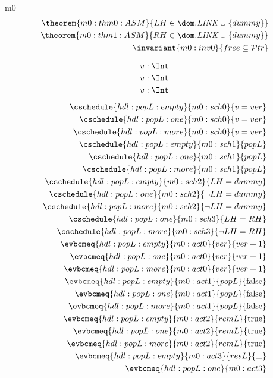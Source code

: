 \documentclass[12pt]{amsart}
\newcommand{\Addr}{\mathcal{P}tr}
\newcommand{\link}{\textit{LINK}}
\begin{document}
\begin{machine}{m0}
\begin{align*}
  \theorem{m0:thm0:ASM}{ LH \in \dom.\link \bunion \{ dummy \} } \\
  \theorem{m0:thm1:ASM}{ RH \in \dom.\link \bunion \{ dummy \} } \\
  \invariant{m0:inv0}{ free \subseteq \Addr }
\end{align*}

\[ \indices{hdl:popL:empty}{ v : \Int } \]
\[ \indices{hdl:popL:one}{ v : \Int } \]
\[ \indices{hdl:popL:more}{ v : \Int } \]

\begin{align*}
  \cschedule{hdl:popL:empty}{m0:sch0}{v = ver} \\
  \cschedule{hdl:popL:one}{m0:sch0}{v = ver} \\
  \cschedule{hdl:popL:more}{m0:sch0}{v = ver} \\
  \cschedule{hdl:popL:empty}{m0:sch1}{popL} \\
  \cschedule{hdl:popL:one}{m0:sch1}{popL} \\
  \cschedule{hdl:popL:more}{m0:sch1}{popL} \\
  \cschedule{hdl:popL:empty}{m0:sch2}{LH = dummy} \\
  \cschedule{hdl:popL:one}{m0:sch2}{\neg LH = dummy} \\
  \cschedule{hdl:popL:more}{m0:sch2}{\neg LH = dummy} \\
  \cschedule{hdl:popL:one}{m0:sch3}{LH = RH} \\
  \cschedule{hdl:popL:more}{m0:sch3}{\neg LH = RH} \\
  \evbcmeq{hdl:popL:empty}{m0:act0}
    {ver}{ver + 1} \\
  \evbcmeq{hdl:popL:one}{m0:act0}
    {ver}{ver + 1} \\
  \evbcmeq{hdl:popL:more}{m0:act0}
    {ver}{ver + 1} \\
  \evbcmeq{hdl:popL:empty}{m0:act1}
    {popL}{\false} \\
  \evbcmeq{hdl:popL:one}{m0:act1}
    {popL}{\false} \\
  \evbcmeq{hdl:popL:more}{m0:act1}
    {popL}{\false} \\
  \evbcmeq{hdl:popL:empty}{m0:act2}
    {remL}{\true} \\
  \evbcmeq{hdl:popL:one}{m0:act2}
    {remL}{\true} \\
  \evbcmeq{hdl:popL:more}{m0:act2}
    {remL}{\true} \\
  \evbcmeq{hdl:popL:empty}{m0:act3}
    {resL}{\bot} \\
  \evbcmeq{hdl:popL:one}{m0:act3}

\end{align*}
\end{machine}
\end{document}
